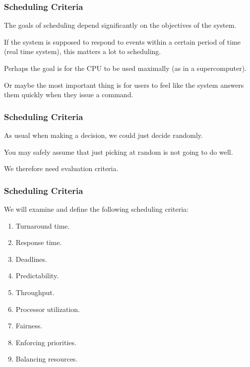 \begin{frame}
\frametitle{Scheduling Criteria}

The goals of scheduling depend significantly on the objectives of the system. 

If the system is supposed to respond to events within a certain period of time (real time system), this matters a lot to scheduling. 

Perhaps the goal is for the CPU to be used maximally (as in a supercomputer). 

Or maybe the most important thing is for users to feel like the system answers them quickly when they issue a command.


\end{frame}

\begin{frame}
\frametitle{Scheduling Criteria}

As usual when making a decision, we could just decide randomly. 

You may safely assume that just picking at random is not going to do well. 

We therefore need evaluation criteria.

\end{frame}

\begin{frame}
\frametitle{Scheduling Criteria}

We will examine and define the following scheduling criteria:

\begin{enumerate}
	\item Turnaround time.
	\item Response time.
	\item Deadlines.
	\item Predictability.
	\item Throughput.
	\item Processor utilization.
	\item Fairness.
	\item Enforcing priorities.
	\item Balancing resources.
\end{enumerate}


\end{frame}

